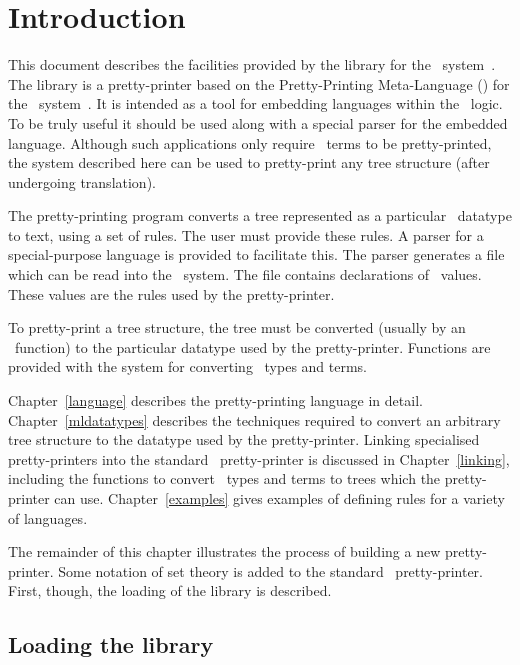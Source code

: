 
\chapter{Introduction\label{intro}}

This document describes the facilities provided by the  library
for the \HOL\ system~\cite{description}. The library is a pretty-printer based
on the Pretty-Printing Meta-Language (\PPML) for the \CENTAUR\
system~\cite{PPML}. It is intended as a tool for embedding languages within
the \HOL\ logic. To be truly useful it should be used along with a special
parser for the embedded language. Although such applications only require
\HOL\ terms to be pretty-printed, the system described here can be used to
pretty-print any tree structure (after undergoing translation).

The pretty-printing program converts a tree represented as a particular \ML\
datatype to text, using a set of rules. The user must provide these rules. A
parser for a special-purpose language is provided to facilitate this. The
parser generates a file which can be read into the \HOL\ system. The file
contains declarations of \ML\ values. These values are the rules used by the
pretty-printer.

To pretty-print a tree structure, the tree must be converted (usually by an
\ML\ function) to the particular datatype used by the pretty-printer. Functions
are provided with the system for converting \HOL\ types and terms.

Chapter~\ref{language} describes the pretty-printing language in detail.
Chapter~\ref{mldatatypes} describes the techniques required to convert an
arbitrary tree structure to the datatype used by the pretty-printer.
Linking specialised pretty-printers into the standard \HOL\ pretty-printer is
discussed in Chapter~\ref{linking}, including the functions to convert \HOL\
types and terms to trees which the pretty-printer can use.
Chapter~\ref{examples} gives examples of defining rules for a variety of
languages. 

The remainder of this chapter illustrates the process of building a new
pretty-printer. Some notation of set theory is added to the standard \HOL\
pretty-printer. First, though, the loading of the library is described.


\section{Loading the library}

